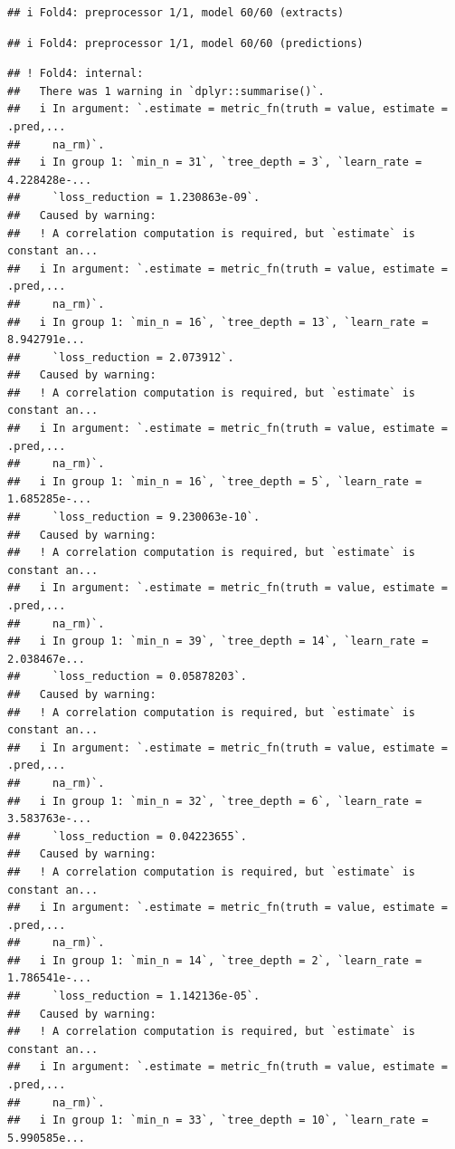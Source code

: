 \documentclass[
]{article}
\begin{document}
\begin{verbatim}
## i Fold4: preprocessor 1/1, model 60/60 (extracts)
\end{verbatim}

\begin{verbatim}
## i Fold4: preprocessor 1/1, model 60/60 (predictions)
\end{verbatim}

\begin{verbatim}
## ! Fold4: internal:
##   There was 1 warning in `dplyr::summarise()`.
##   i In argument: `.estimate = metric_fn(truth = value, estimate = .pred,...
##     na_rm)`.
##   i In group 1: `min_n = 31`, `tree_depth = 3`, `learn_rate = 4.228428e-...
##     `loss_reduction = 1.230863e-09`.
##   Caused by warning:
##   ! A correlation computation is required, but `estimate` is constant an...
##   i In argument: `.estimate = metric_fn(truth = value, estimate = .pred,...
##     na_rm)`.
##   i In group 1: `min_n = 16`, `tree_depth = 13`, `learn_rate = 8.942791e...
##     `loss_reduction = 2.073912`.
##   Caused by warning:
##   ! A correlation computation is required, but `estimate` is constant an...
##   i In argument: `.estimate = metric_fn(truth = value, estimate = .pred,...
##     na_rm)`.
##   i In group 1: `min_n = 16`, `tree_depth = 5`, `learn_rate = 1.685285e-...
##     `loss_reduction = 9.230063e-10`.
##   Caused by warning:
##   ! A correlation computation is required, but `estimate` is constant an...
##   i In argument: `.estimate = metric_fn(truth = value, estimate = .pred,...
##     na_rm)`.
##   i In group 1: `min_n = 39`, `tree_depth = 14`, `learn_rate = 2.038467e...
##     `loss_reduction = 0.05878203`.
##   Caused by warning:
##   ! A correlation computation is required, but `estimate` is constant an...
##   i In argument: `.estimate = metric_fn(truth = value, estimate = .pred,...
##     na_rm)`.
##   i In group 1: `min_n = 32`, `tree_depth = 6`, `learn_rate = 3.583763e-...
##     `loss_reduction = 0.04223655`.
##   Caused by warning:
##   ! A correlation computation is required, but `estimate` is constant an...
##   i In argument: `.estimate = metric_fn(truth = value, estimate = .pred,...
##     na_rm)`.
##   i In group 1: `min_n = 14`, `tree_depth = 2`, `learn_rate = 1.786541e-...
##     `loss_reduction = 1.142136e-05`.
##   Caused by warning:
##   ! A correlation computation is required, but `estimate` is constant an...
##   i In argument: `.estimate = metric_fn(truth = value, estimate = .pred,...
##     na_rm)`.
##   i In group 1: `min_n = 33`, `tree_depth = 10`, `learn_rate = 5.990585e...

\end{verbatim}
\end{document}
